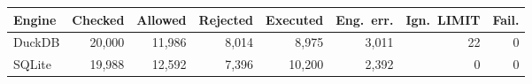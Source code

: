 \begin{tabular}{lrrrrrrr}
\toprule
Engine & Checked & Allowed & Rejected & Executed & Eng.\ err. & Ign.\ LIMIT & Fail. \\
\midrule
DuckDB & 20{,}000 & 11{,}986 & 8{,}014 & 8{,}975 & 3{,}011 & 22 & 0 \\
SQLite & 19{,}988 & 12{,}592 & 7{,}396 & 10{,}200 & 2{,}392 & 0 & 0 \\
\bottomrule
\end{tabular}
